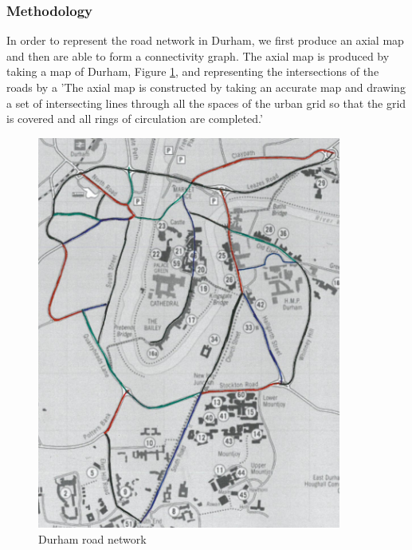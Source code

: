 \documentclass[11pt]{report}
\begin{document}
\subsubsection{Methodology}
In order to represent the road network in Durham, we first produce an axial map and then are able to form a connectivity graph. The axial map is produced by taking a map of Durham, Figure \ref{durham map}, and representing the intersections of the roads by a 'The axial map is constructed by taking an accurate map and drawing a set of intersecting lines through all the spaces of the urban grid so that the grid is covered and all rings of circulation are completed.'\cite{space}



\begin{figure}[h]
\centering
\includegraphics[width=10cm]{durham_with_colour.jpg}
\caption{Durham road network}
\label{durham map}
\end{figure}
\end{document}
